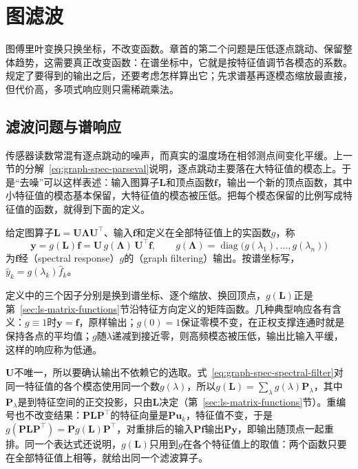 
\section{图滤波}
\label{sec:graph-filtering}

图傅里叶变换只换坐标，不改变函数。章首的第二个问题是压低逐点跳动、保留整体趋势，这需要真正改变函数：在谱坐标中，它就是按特征值调节各模态的系数。规定了要得到的输出之后，还要考虑怎样算出它；先求谱基再逐模态缩放最直接，但代价高，多项式响应则只需稀疏乘法。

\subsection{滤波问题与谱响应}
\label{sec:graph-spec-filtering-problem}

传感器读数常混有逐点跳动的噪声，而真实的温度场在相邻测点间变化平缓。上一节的分解~\eqref{eq:graph-spec-parseval}说明，逐点跳动主要落在大特征值的模态上。于是“去噪”可以这样表述：输入图算子$\bm L$和顶点函数$\bm f$，输出一个新的顶点函数，其中小特征值的模态基本保留，大特征值的模态被压低。把每个模态保留的比例写成特征值的函数，就得到下面的定义。

\begin{definition}[谱滤波]
\label{def:graph-spec-spectral-filter}
给定图算子$\bm L=\bm U\bm\Lambda\bm U^{\top}$、输入$\bm f$和定义在全部特征值上的实函数$g$，称
\begin{equation}
 \bm y=g(\bm L)\bm f=\bm U\,g(\bm\Lambda)\,\bm U^{\top}\bm f,\qquad
 g(\bm\Lambda)=\operatorname{diag}\bigl(g(\lambda_1),\ldots,g(\lambda_n)\bigr)
 \label{eq:graph-spec-spectral-filter}
\end{equation}
为$\bm f$经（spectral response）$g$的（graph filtering）输出。按谱坐标写，$\widehat y_k=g(\lambda_k)\widehat f_k$。
\end{definition}

定义中的三个因子分别是换到谱坐标、逐个缩放、换回顶点，$g(\bm L)$正是第~\ref{sec:ls-matrix-functions}节沿特征方向定义的矩阵函数。几种典型响应各有含义：$g\equiv1$时$\bm y=\bm f$，原样输出；$g(0)=1$保证零模不变，在正权支撑连通时就是保持各点的平均值；$g$随$\lambda$递减到接近零，则高频模态被压低，输出比输入平缓，这样的响应称为低通。

$\bm U$不唯一，所以要确认输出不依赖它的选取。式~\eqref{eq:graph-spec-spectral-filter}对同一特征值的各个模态使用同一个数$g(\lambda)$，所以$g(\bm L)=\sum_\lambda g(\lambda)\bm P_\lambda$，其中$\bm P_\lambda$是到特征空间的正交投影，只由$\bm L$决定（第~\ref{sec:ls-matrix-functions}节）。重编号也不改变结果：$\bm P\bm L\bm P^{\top}$的特征向量是$\bm P\bm u_k$，特征值不变，于是$g(\bm P\bm L\bm P^{\top})=\bm Pg(\bm L)\bm P^{\top}$，对重排后的输入$\bm P\bm f$输出$\bm P\bm y$，即输出随顶点一起重排。同一个表达式还说明，$g(\bm L)$只用到$g$在各个特征值上的取值：两个函数只要在全部特征值上相等，就给出同一个滤波算子。

